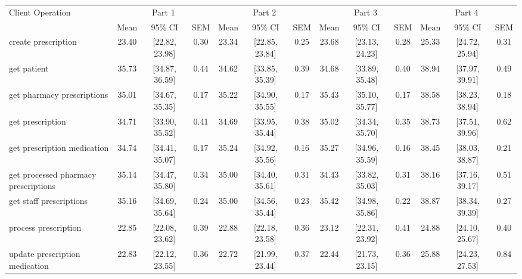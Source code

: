 \begin{tabular}{l|ccc|ccc|ccc|ccc}
\hline
Client Operation & \multicolumn{3}{c}{Part 1} & \multicolumn{3}{c}{Part 2} & \multicolumn{3}{c}{Part 3} & \multicolumn{3}{c}{Part 4} \\
  & Mean & 95\% CI & SEM & Mean & 95\% CI & SEM & Mean & 95\% CI & SEM & Mean & 95\% CI & SEM \\
\hline
 create prescription & 23.40 & [22.82, 23.98] & 0.30 & 23.34 & [22.85, 23.84] & 0.25 & 23.68 & [23.13, 24.23] & 0.28 & 25.33 & [24.72, 25.94] & 0.31 \\
 get patient & 35.73 & [34.87, 36.59] & 0.44 & 34.62 & [33.85, 35.39] & 0.39 & 34.68 & [33.89, 35.48] & 0.40 & 38.94 & [37.97, 39.91] & 0.49 \\
 get pharmacy prescriptions & 35.01 & [34.67, 35.35] & 0.17 & 35.22 & [34.90, 35.55] & 0.17 & 35.43 & [35.10, 35.77] & 0.17 & 38.58 & [38.23, 38.94] & 0.18 \\
 get prescription & 34.71 & [33.90, 35.52] & 0.41 & 34.69 & [33.95, 35.44] & 0.38 & 35.02 & [34.34, 35.70] & 0.35 & 38.73 & [37.51, 39.96] & 0.62 \\
 get prescription medication & 34.74 & [34.41, 35.07] & 0.17 & 35.24 & [34.92, 35.56] & 0.16 & 35.27 & [34.96, 35.59] & 0.16 & 38.45 & [38.03, 38.87] & 0.21 \\
 get processed pharmacy prescriptions & 35.14 & [34.47, 35.80] & 0.34 & 35.00 & [34.40, 35.61] & 0.31 & 34.43 & [33.82, 35.03] & 0.31 & 38.16 & [37.16, 39.17] & 0.51 \\
 get staff prescriptions & 35.16 & [34.69, 35.64] & 0.24 & 35.00 & [34.56, 35.44] & 0.23 & 35.42 & [34.98, 35.86] & 0.22 & 38.87 & [38.34, 39.39] & 0.27 \\
 process prescription & 22.85 & [22.08, 23.62] & 0.39 & 22.88 & [22.18, 23.58] & 0.36 & 23.12 & [22.31, 23.92] & 0.41 & 24.88 & [24.10, 25.67] & 0.40 \\
 update prescription medication & 22.83 & [22.12, 23.55] & 0.36 & 22.72 & [21.99, 23.44] & 0.37 & 22.44 & [21.73, 23.15] & 0.36 & 25.88 & [24.23, 27.53] & 0.84 \\
\hline
\end{tabular}
